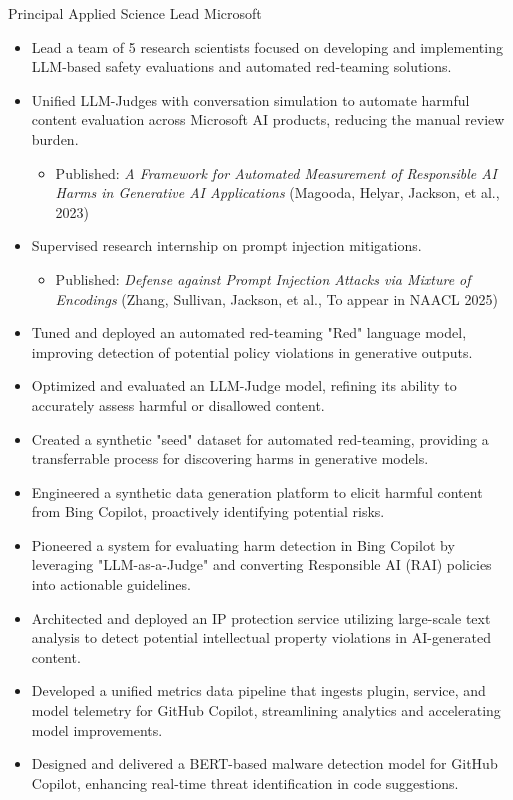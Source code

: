 \documentclass[11pt,a4paper,sans]{moderncv}
\begin{document}
        {Principal Applied Science Lead}
        {Microsoft}
        {}
        {}
        {
          \begin{itemize}
            \item Lead a team of 5 research scientists focused on developing and implementing LLM-based safety evaluations and automated red-teaming solutions.
            \item Unified LLM-Judges with conversation simulation to automate harmful content evaluation across Microsoft AI products, reducing the manual review burden.
              \begin{itemize}
                \item Published: \textit{A Framework for Automated Measurement of Responsible AI Harms in Generative AI Applications} (Magooda, Helyar, Jackson, et al., 2023)
              \end{itemize}
            \item Supervised research internship on prompt injection mitigations.
              \begin{itemize}
                \item Published: \textit{Defense against Prompt Injection Attacks via Mixture of Encodings} (Zhang, Sullivan, Jackson, et al., To appear in NAACL 2025)
              \end{itemize}
            \item Tuned and deployed an automated red-teaming "Red" language model, improving detection of potential policy violations in generative outputs.
            \item Optimized and evaluated an LLM-Judge model, refining its ability to accurately assess harmful or disallowed content.
            \item Created a synthetic "seed" dataset for automated red-teaming, providing a transferrable process for discovering harms in generative models.
            \item Engineered a synthetic data generation platform to elicit harmful content from Bing Copilot, proactively identifying potential risks.
            \item Pioneered a system for evaluating harm detection in Bing Copilot by leveraging "LLM-as-a-Judge" and converting Responsible AI (RAI) policies into actionable guidelines.
            \item Architected and deployed an IP protection service utilizing large-scale text analysis to detect potential intellectual property violations in AI-generated content.
            \item Developed a unified metrics data pipeline that ingests plugin, service, and model telemetry for GitHub Copilot, streamlining analytics and accelerating model improvements.
            \item Designed and delivered a BERT-based malware detection model for GitHub Copilot, enhancing real-time threat identification in code suggestions.
          \end{itemize}
        }
\end{document}
